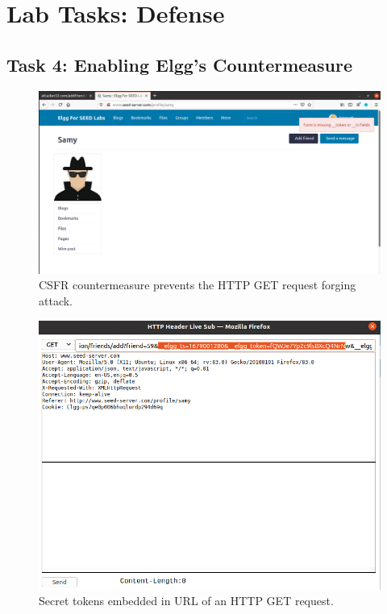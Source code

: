\section{Lab Tasks: Defense}
%
\subsection{Task 4: Enabling Elgg's Countermeasure}
%
\begin{figure}
    \centering
    \includegraphics[height=\textheight,width=\textwidth,keepaspectratio]
    {figures/add_friend_countermeasure.png}
    \caption{CSFR countermeasure prevents the HTTP GET request forging attack.}
    \label{fig:counter_add_friend}
\end{figure}

\begin{figure}
    \centering
    \includegraphics[height=\textheight,width=\textwidth,keepaspectratio]
    {figures/token_http_get.png}
    \caption{Secret tokens embedded in URL of an HTTP GET request.}
    \label{fig:secret_token}
\end{figure}


